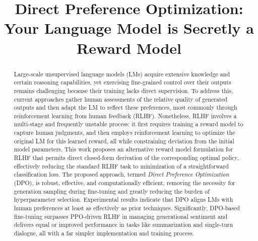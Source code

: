 \title{Direct Preference Optimization: Your Language Model is Secretly a Reward Model}

\begin{abstract}
Large-scale unsupervised language models (LMs) acquire extensive knowledge and certain reasoning capabilities, yet exercising fine-grained control over their outputs remains challenging because their training lacks direct supervision. To address this, current approaches gather human assessments of the relative quality of generated outputs and then adapt the LM to reflect these preferences, most commonly through reinforcement learning from human feedback (RLHF). Nonetheless, RLHF involves a multi-stage and frequently unstable process: it first requires training a reward model to capture human judgments, and then employs reinforcement learning to optimize the original LM for this learned reward, all while constraining deviation from the initial model parameters. This work proposes an alternative reward model formulation for RLHF that permits direct closed-form derivation of the corresponding optimal policy, effectively reducing the standard RLHF task to minimization of a straightforward classification loss. The proposed approach, termed \textit{Direct Preference Optimization} (DPO), is robust, effective, and computationally efficient, removing the necessity for generation sampling during fine-tuning and greatly reducing the burden of hyperparameter selection. Experimental results indicate that DPO aligns LMs with human preferences at least as effectively as prior techniques. Significantly, DPO-based fine-tuning surpasses PPO-driven RLHF in managing generational sentiment and delivers equal or improved performance in tasks like summarization and single-turn dialogue, all with a far simpler implementation and training process.
\end{abstract}

